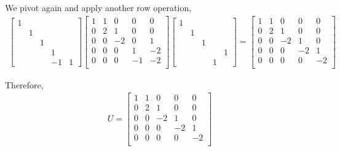 \documentclass[10pt]{article}
\begin{document}
\begin{solution}[Solution]
\begin{enumerate}
    We pivot again and apply another row operation,
    {\footnotesize
    \begin{align*}
        \left[\begin{array}{rrrrr}
            1 \\
            & 1 \\
            & & 1 \\
            & & & 1 \\
            & & & -1 & 1 
        \end{array}\right]
         \left[\begin{array}{ccccc}
            1 & 1 & 0 & 0 & 0 \\
            0 & 2 & 1 & 0 & 0 \\
            0 & 0 & -2 & 0 & 1 \\
            0 & 0 & 0 & 1 & -2 \\
            0 & 0 & 0 & -1 & -2 \\
        \end{array}\right]
       \left[\begin{array}{rrrrr}
            1 \\
            & 1 \\
            & & 1 \\
            & & & & 1 \\
            & & & 1 
       \end{array}\right]
        =
        \left[\begin{array}{ccccc}
            1 & 1 & 0 & 0 & 0 \\
            0 & 2 & 1 & 0 & 0 \\
            0 & 0 & -2 & 1 & 0 \\
            0 & 0 & 0 & -2 & 1 \\
            0 & 0 & 0 & 0 & -2 \\
        \end{array}\right]
    \end{align*}
    }

    Therefore,
    {\footnotesize
        \begin{align*}
        U = 
         \left[\begin{array}{ccccc}
            1 & 1 & 0 & 0 & 0 \\
            0 & 2 & 1 & 0 & 0 \\
            0 & 0 & -2 & 1 & 0 \\
            0 & 0 & 0 & -2 & 1 \\
            0 & 0 & 0 & 0 & -2 \\
        \end{array}\right]
    \end{align*}
    }


\end{enumerate}
\end{solution}
\end{document}
